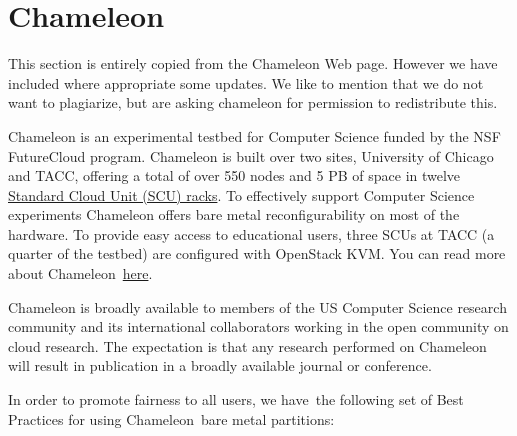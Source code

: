
%


\part{Chameleon}

This section is entirely copied from the Chameleon Web page. However
we have included where appropriate some updates. We like to mention
that we do not want to plagiarize, but are asking chameleon for
permission to redistribute this.

Chameleon is an experimental testbed for Computer Science funded by the
NSF FutureCloud program. Chameleon is built over two sites, University
of Chicago and TACC, offering a total of over 550 nodes and 5 PB of
space in twelve
\href{https://www.chameleoncloud.org/about/hardware-description/}{Standard
Cloud Unit (SCU) racks}. To effectively support Computer Science
experiments Chameleon offers bare metal reconfigurability on most of the
hardware. To provide easy access to educational users, three SCUs at
TACC (a quarter of the testbed) are configured with OpenStack KVM. You
can read more about
Chameleon~\href{https://www.chameleoncloud.org/about/chameleon/}{here}.

Chameleon is broadly available to members of the US Computer Science
research community and its international collaborators working in the
open community on cloud research. The expectation is that any research
performed on Chameleon will result in publication in a broadly
available journal or conference.

In order to promote fairness to all users, we have~the following set of
Best Practices for using Chameleon~bare metal partitions:

